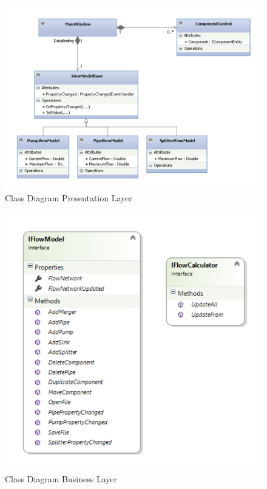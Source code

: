 \begin{figure}
	\centering
	\includegraphics[width=\textwidth]{figures/PresentationOverall.pdf}
	\caption{Class Diagram Presentation Layer}
	\label{fig:presentationoverall}
\end{figure}

\begin{figure}
	\centering
	\includegraphics[width=\textwidth]{figures/BusinessOverall.pdf}
	\caption{Class Diagram Business Layer}
	\label{fig:businesslayer}
\end{figure}

